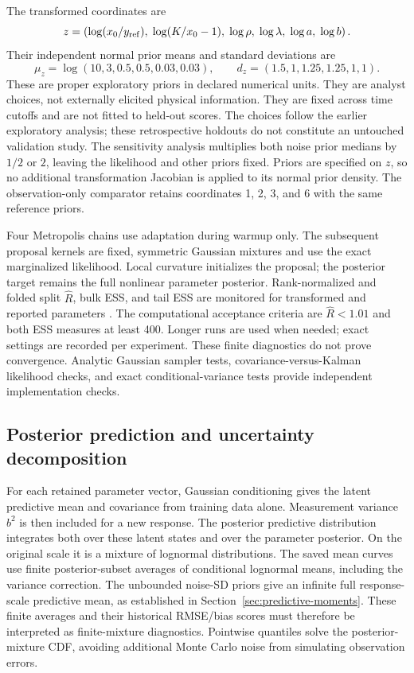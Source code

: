     The transformed coordinates are
    \[
        z=\left(
            \log(x_0/y_{\rm ref}),\;
            \log(K/x_0-1),\;
            \log\rho,\;\log\lambda,\;\log a,\;\log b
        \right).
    \]
    Their independent normal prior means and standard deviations are
    \[
        \mu_z=\log(10,3,0.5,0.5,0.03,0.03),\qquad
        d_z=(1.5,1,1.25,1.25,1,1).
    \]
    These are proper exploratory priors in declared numerical units. They are
    analyst choices, not externally elicited physical information. They are
    fixed across time cutoffs and are not fitted to held-out scores. The
    choices follow the earlier exploratory analysis; these retrospective
    holdouts do not constitute an untouched validation study. The
    sensitivity analysis multiplies both noise prior medians by \(1/2\) or
    \(2\), leaving the likelihood and other priors fixed. Priors are specified
    on \(z\), so no additional transformation Jacobian is applied to its
    normal prior density. The observation-only comparator retains coordinates
    1, 2, 3, and 6 with the same reference priors.

    Four Metropolis chains use adaptation during warmup only. The subsequent
    proposal kernels are fixed, symmetric Gaussian mixtures and use the exact
    marginalized likelihood. Local curvature initializes the proposal; the
    posterior target remains the full nonlinear parameter posterior.
    Rank-normalized and folded split \(\widehat R\), bulk ESS, and tail ESS
    are monitored for transformed and reported parameters
    \citep{vehtari2021rank}. The computational acceptance criteria are
    \(\widehat R<1.01\) and both ESS measures at least 400. Longer runs are
    used when needed; exact settings are recorded per experiment. These finite
    diagnostics do not prove convergence. Analytic Gaussian sampler tests,
    covariance-versus-Kalman likelihood checks, and exact conditional-variance
    tests provide independent implementation checks.

\subsection{Posterior prediction and uncertainty decomposition}

    For each retained parameter vector, Gaussian conditioning gives the latent
    predictive mean and covariance from training data alone. Measurement
    variance \(b^2\) is then included for a new response. The posterior
    predictive distribution integrates both over these latent states and over
    the parameter posterior. On the original scale it is a mixture of
    lognormal distributions. The saved mean curves use finite posterior-subset
    averages of conditional lognormal means, including the variance correction.
    The unbounded noise-SD priors give an infinite full response-scale
    predictive mean, as established in Section~\ref{sec:predictive-moments}.
    These finite averages and their historical RMSE/bias scores must therefore
    be interpreted as finite-mixture diagnostics. Pointwise quantiles solve
    the posterior-mixture CDF, avoiding
    additional Monte Carlo noise from simulating observation errors.

